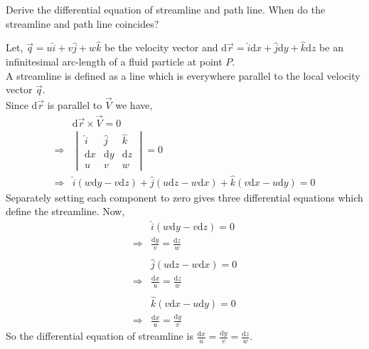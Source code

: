 \documentclass[12pt]{article}
\begin{document}
\newpage
\begin{prob}
    Derive the differential equation of streamline and path line. When do the streamline and path line coincides?
\end{prob}
\begin{soln}
    Let, $ \vec{q}=u\hat{i}+v\hat{j}+w\hat{k} $ be the velocity vector and $ \mathrm{d}\vec{r}=\hat{i}\mathrm{d}x+\hat{j}\mathrm{d}y+\hat{k}\mathrm{d}z $ be an infinitesimal arc-length of a fluid particle at point $ P $.\\
    
    A streamline is defined as a line which is everywhere parallel to the local velocity vector $ \vec{q} $.\\
    Since $ \mathrm{d}\vec{r} $ is parallel to $ \vec{V} $ we have,
    \begin{align*}
        & \mathrm{d}\vec{r}\times \vec{V}=0\\
        \Rightarrow & \begin{vmatrix}
            \hat{i}&\hat{j}&\hat{k}\\
            \mathrm{d}x&\mathrm{d}y&\mathrm{d}z\\
            u&v&w
        \end{vmatrix}=0\\
        \Rightarrow& \hat{i}(w\mathrm{d}y-v\mathrm{d}z)+\hat{j}(u\mathrm{d}z-w\mathrm{d}x)+\hat{k}(v\mathrm{d}x-u\mathrm{d}y)=0
    \end{align*}
    Separately setting each component to zero gives three differential equations which define the streamline.
    Now,
    \begin{align*}
        &\hat{i}(w\mathrm{d}y-v\mathrm{d}z)=0\\
        \Rightarrow& \frac{\mathrm{d}y}{v}=\frac{\mathrm{d}z}{w}\\
        &\\
        &\hat{j}(u\mathrm{d}z-w\mathrm{d}x)=0\\
        \Rightarrow& \frac{\mathrm{d}x}{u}=\frac{\mathrm{d}z}{w}\\
        &\\
        &\hat{k}(v\mathrm{d}x-u\mathrm{d}y)=0\\
        \Rightarrow& \frac{\mathrm{d}x}{u}=\frac{\mathrm{d}y}{v}
    \end{align*}
    So the differential equation of streamline is $ \frac{\mathrm{d}x}{u}=\frac{\mathrm{d}y}{v}=\frac{\mathrm{d}z}{w} $.\\


\end{soln}
\end{document}
